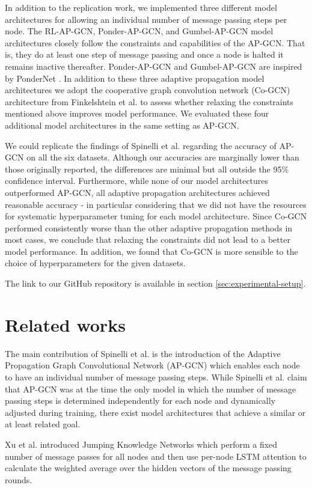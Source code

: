 \documentclass{gdl}
\begin{document}
In addition to the replication work, we implemented three different model architectures for allowing an individual number of message passing steps per node. The RL-AP-GCN, Ponder-AP-GCN, and Gumbel-AP-GCN model architectures closely follow the constraints and capabilities of the AP-GCN. That is, they do at least one step of message passing and once a node is halted it remains inactive thereafter. Ponder-AP-GCN and Gumbel-AP-GCN are inspired by PonderNet \cite{banino2021}. In addition to these three adaptive propagation model architectures we adopt the cooperative graph convolution network (Co-GCN) architecture from Finkelshtein et al. \cite{finkelshtein2024} to assess whether relaxing the constraints mentioned above improves model performance. We evaluated these four additional model architectures in the same setting as AP-GCN.

We could replicate the findings of Spinelli et al. regarding the accuracy of AP-GCN on all the six datasets. Although our accuracies are marginally lower than those originally reported, the differences are minimal but all outside the 95\% confidence interval. 
Furthermore, while none of our model architectures outperformed AP-GCN, all adaptive propagation architectures achieved reasonable accuracy - in particular considering that we did not have the resources for systematic hyperparameter tuning for each model architecture. Since Co-GCN performed consistently worse than the other adaptive propagation methods in most cases, we conclude that relaxing the constraints did not lead to a better model performance. In addition, we found that Co-GCN is more sensible to the choice of hyperparameters for the given datasets.

The link to our GitHub repository is available in section \ref{sec:experimental-setup}.

\section{Related works}
The main contribution of Spinelli et al. is the introduction of the Adaptive Propagation Graph Convolutional Network (AP-GCN) which enables each node to have an individual number of message passing steps. While Spinelli et al. claim that AP-GCN was at the time the only model in which the number of message passing steps is determined independently for each node and dynamically adjusted during training, there exist model architectures that achieve a similar or at least related goal.

Xu et al. \cite{xu2018} introduced Jumping Knowledge Networks which perform a fixed number of message passes for all nodes and then use per-node LSTM attention to calculate the weighted average over the hidden vectors of the message passing rounds.   
\end{document}
